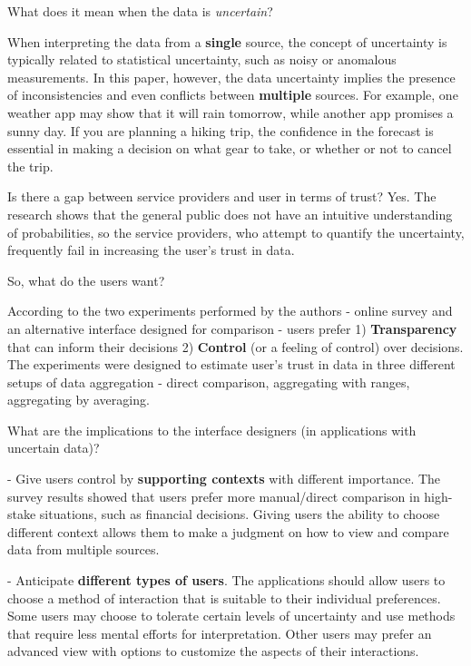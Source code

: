 \documentclass[12pt,letterpaper]{article}
\begin{document}
What does it mean when the data is \textit{uncertain}? 

When interpreting the data from a \textbf{single} source, the concept of uncertainty is typically related to statistical uncertainty, such as noisy or anomalous measurements. In this paper, however, the data uncertainty implies the presence of inconsistencies and even conflicts between \textbf{multiple} sources. For example, one weather app may show that it will rain tomorrow, while another app promises a sunny day. If you are planning a hiking trip, the confidence in the forecast is essential in making a decision on what gear to take, or whether or not to cancel the trip.  

Is there a gap between service providers and user in terms of trust? Yes. The research shows that the general public does not have an intuitive understanding of probabilities, so the service providers, who attempt to quantify the uncertainty, frequently fail in increasing the user's trust in data.

So, what do the users want? 

According to the two experiments performed by the authors - online survey and an alternative interface designed for comparison - users prefer 1) \textbf{Transparency} that can inform their decisions 2) \textbf{Control} (or a feeling of control) over decisions. The experiments were designed to estimate user's trust in data in three different setups of data aggregation - direct comparison, aggregating with ranges, aggregating by averaging. 

What are the implications to the interface designers (in applications with uncertain data)?

\hspace{10mm} - Give users control by \textbf{supporting contexts} with different importance. The survey results showed that users prefer more manual/direct comparison in high-stake situations, such as financial decisions. Giving users the ability to choose different context allows them to make a judgment on how to view and compare data from multiple sources.  

\hspace{10mm} - Anticipate \textbf{different types of users}. The applications should allow users to choose a method of interaction that is suitable to their individual preferences. Some users may choose to tolerate certain levels of uncertainty and use methods that require less mental efforts for interpretation. Other users may prefer an advanced view with options to customize the aspects of their interactions. 
\end{document}
